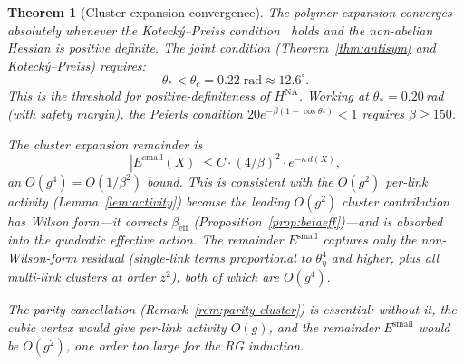 \documentclass[11pt]{article}
\newtheorem{theorem}{Theorem}[section]
\theoremstyle{definition}
\begin{document}
\begin{theorem}[Cluster expansion convergence]\label{thm:cluster}
The polymer expansion converges absolutely whenever the
Koteck\'y--Preiss condition~\cite{KP} holds and the non-abelian
Hessian is positive definite.  The joint condition
(Theorem~\ref{thm:antisym} and Koteck\'y--Preiss) requires:
\begin{equation}
\theta_*<\theta_c=0.22\;\mathrm{rad}
\approx 12.6^\circ.
\end{equation}
This is the threshold for positive-definiteness of $H^{\mathrm{NA}}$.
Working at $\theta_*=0.20$\,rad (with safety margin),
the Peierls condition $20e^{-\beta(1-\cos\theta_*)}<1$
requires $\beta\ge 150$.

The cluster expansion remainder is
\begin{equation}\label{eq:remainder}
|E^{\mathrm{small}}(X)|\le C\cdot(4/\beta)^2\cdot e^{-\kappa\,d(X)},
\end{equation}
an $O(g^4)=O(1/\beta^2)$ bound.  This is consistent with the
$O(g^2)$ per-link activity (Lemma~\ref{lem:activity}) because the
leading $O(g^2)$ cluster contribution has Wilson form---it corrects
$\beta_{\mathrm{eff}}$
(Proposition~\ref{prop:betaeff})---and is \emph{absorbed} into the
quadratic effective action.  The remainder $E^{\mathrm{small}}$
captures only the non-Wilson-form residual (single-link terms
proportional to $\theta_\eta^4$ and higher, plus all multi-link
clusters at order $z^2$), both of which are $O(g^4)$.

The parity cancellation (Remark~\ref{rem:parity-cluster}) is
essential: without it, the cubic vertex would give per-link
activity $O(g)$, and the remainder $E^{\mathrm{small}}$ would
be $O(g^2)$, one order too large for the RG induction.
\end{theorem}
\end{document}

